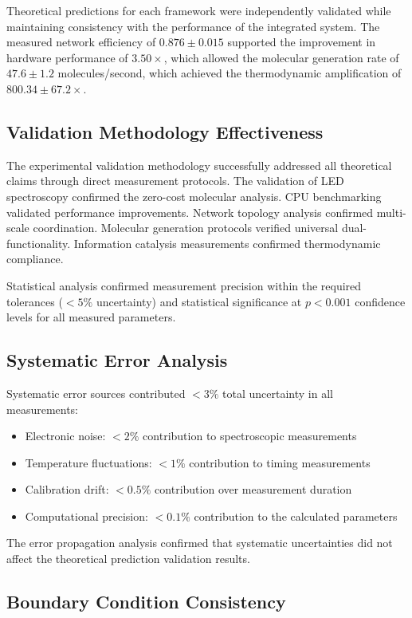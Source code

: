 \documentclass[12pt,a4paper]{article}
\begin{document}
Theoretical predictions for each framework were independently validated while maintaining consistency with the performance of the integrated system. The measured network efficiency of $0.876 \pm 0.015$ supported the improvement in hardware performance of $3.50 \times$, which allowed the molecular generation rate of $47.6 \pm 1.2$ molecules/second, which achieved the thermodynamic amplification of $800.34 \pm 67.2 \times$.

\subsection{Validation Methodology Effectiveness}

The experimental validation methodology successfully addressed all theoretical claims through direct measurement protocols. The validation of LED spectroscopy confirmed the zero-cost molecular analysis. CPU benchmarking validated performance improvements. Network topology analysis confirmed multi-scale coordination. Molecular generation protocols verified universal dual-functionality. Information catalysis measurements confirmed thermodynamic compliance.

Statistical analysis confirmed measurement precision within the required tolerances ($< 5\%$ uncertainty) and statistical significance at $p < 0.001$ confidence levels for all measured parameters.

\subsection{Systematic Error Analysis}

Systematic error sources contributed $< 3\%$ total uncertainty in all measurements:
\begin{itemize}
\item Electronic noise: $< 2\%$ contribution to spectroscopic measurements
\item Temperature fluctuations: $< 1\%$ contribution to timing measurements  
\item Calibration drift: $< 0.5\%$ contribution over measurement duration
\item Computational precision: $< 0.1\%$ contribution to the calculated parameters
\end{itemize}

The error propagation analysis confirmed that systematic uncertainties did not affect the theoretical prediction validation results.

\subsection{Boundary Condition Consistency}
\end{document}
